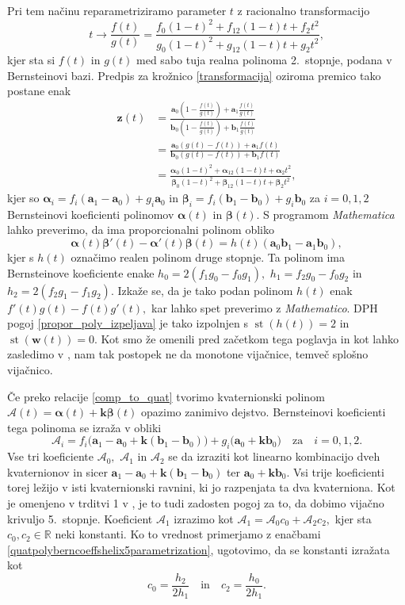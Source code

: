 \documentclass[12pt,a4paper,twoside]{article}
\theoremstyle{definition} %
\theoremstyle{plain} %
\numberwithin{equation}{section}  %
\newcommand{\R}{\mathbb R}
\newcommand{\aV}{\mathbf{a}}
\newcommand{\bV}{\mathbf{b}}
\newcommand{\kV}{\mathbf{k}}
\newcommand{\wV}{\mathbf{w}}
\newcommand{\zV}{\mathbf{z}}
\newcommand{\AQ}{\mathcal{A}}
\newcommand{\balpha}{\boldsymbol \alpha}
\newcommand{\bbeta}{\boldsymbol \beta}
\DeclareMathOperator{\st}{st}
\begin{document}
Pri tem načinu reparametriziramo parameter $t$ z racionalno transformacijo
\begin{equation}
	\label{kvadraticna_reparametrizacija}
	t\to\frac{f(t)}{g(t)}=\frac{f_0(1-t)^2+f_12(1-t)t+f_2t^2}{g_0(1-t)^2+g_12(1-t)t+g_2t^2},
\end{equation}
kjer sta si $f(t)$ in $g(t)$ med sabo tuja realna polinoma 2.\ stopnje, podana v Bernsteinovi bazi. Predpis za krožnico \eqref{transformacija} oziroma premico tako postane enak
\begin{align*}
	\zV(t)&=\frac{\aV_0\left(1-\frac{f(t)}{g(t)}\right)+\aV_1\frac{f(t)}{g(t)}}{\bV_0\left(1-\frac{f(t)}{g(t)}\right)+\bV_1\frac{f(t)}{g(t)}}\\
	&=\frac{\aV_0(g(t)-f(t))+\aV_1f(t)}{\bV_0(g(t)-f(t))+\bV_1f(t)}\\
	&=\frac{\balpha_0(1-t)^2+\balpha_12(1-t)t+\balpha_2t^2}{\bbeta_0(1-t)^2+\bbeta_12(1-t)t+\bbeta_2t^2},
\end{align*}
kjer so $\balpha_i=f_i(\aV_1-\aV_0)+g_i\aV_0$ in $\bbeta_i=f_i(\bV_1-\bV_0)+g_i\bV_0$ za $i=0,1,2$ Bernsteinovi koeficienti polinomov $\balpha(t)$ in $\bbeta(t).$ S programom \emph{Mathematica} lahko preverimo, da ima proporcionalni polinom obliko
\begin{equation*}
	\balpha(t)\bbeta'(t)-\balpha'(t)\bbeta(t)=h(t)(\aV_0\bV_1-\aV_1\bV_0),
\end{equation*}
kjer s $h(t)$ označimo realen polinom druge stopnje. Ta polinom ima Bernsteinove koeficiente enake $h_0=2(f_1g_0-f_0g_1),$ $h_1=f_2g_0-f_0g_2$ in $h_2=2(f_2g_1-f_1g_2).$ Izkaže se, da je tako podan polinom $h(t)$ enak $f'(t)g(t)-f(t)g'(t),$ kar lahko spet preverimo z \emph{Mathematico}. DPH pogoj \eqref{propor_poly_izpeljava} je tako izpolnjen s $\st(h(t))=2$ in $\st(\wV(t))=0.$ Kot smo že omenili pred začetkom tega poglavja in kot lahko zasledimo v \cite{beltranmonterde}, nam tak postopek ne da monotone vijačnice, temveč splošno vijačnico.

Če preko relacije \eqref{comp_to_quat} tvorimo kvaternionski polinom $\AQ(t)=\balpha(t)+\kV\bbeta(t)$ opazimo zanimivo dejstvo. Bernsteinovi koeficienti tega polinoma se izraža v obliki
\begin{equation}
	\label{quatpolyberncoeffshelix5parametrization}
	\AQ_i=f_i\big(\aV_1-\aV_0+\kV(\bV_1-\bV_0)\big)+g_i\big(\aV_0+\kV\bV_0\big)\quad\text{za}\quad i=0,1,2.
\end{equation}
Vse tri koeficiente $\AQ_0,$ $\AQ_1$ in $\AQ_2$ se da izraziti kot linearno kombinacijo dveh kvaternionov in sicer $\aV_1-\aV_0+\kV(\bV_1-\bV_0)$ ter $\aV_0+\kV\bV_0.$ Vsi trije koeficienti torej ležijo v isti kvaternionski ravnini, ki jo razpenjata ta dva kvaterniona. Kot je omenjeno v trditvi 1 v \cite{faroukietal2004}, je to tudi zadosten pogoj za to, da dobimo vijačno krivuljo 5.\ stopnje. Koeficient $\AQ_1$ izrazimo kot $\AQ_1=\AQ_0c_0+\AQ_2c_2,$ kjer sta $c_0,c_2\in\R$ neki konstanti. Ko to vrednost primerjamo z enačbami \eqref{quatpolyberncoeffshelix5parametrization}, ugotovimo, da se konstanti izražata kot
\begin{equation*}
	c_0=\frac{h_2}{2h_1}\quad\text{in}\quad c_2=\frac{h_0}{2h_1}.
\end{equation*}
\end{document}
